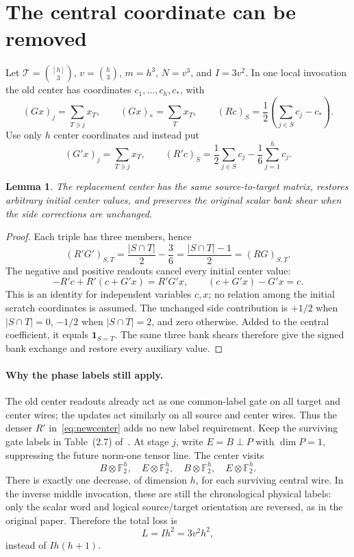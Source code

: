 \documentclass[11pt]{article}
\newtheorem{lemma}{Lemma}
\newcommand{\F}{\mathbb F}
\begin{document}
\section{The central coordinate can be removed}
Let $\mathcal T=\binom{[h]}3$, $v=\binom h3$, $m=h^3$, $N=v^3$, and $I=3v^2$. In one local invocation the old center has coordinates $c_1,\ldots,c_h,c_*$, with
\[
 (Gx)_j=\sum_{T\ni j}x_T,\qquad (Gx)_*=\sum_Tx_T,
 \qquad (Rc)_S=\frac12\left(\sum_{j\in S}c_j-c_*\right).
\]
Use only $h$ center coordinates and instead put
\begin{equation}\label{eq:newcenter}
 (G'x)_j=\sum_{T\ni j}x_T,\qquad
 (R'c)_S=\frac12\sum_{j\in S}c_j-\frac16\sum_{j=1}^h c_j.
\end{equation}
\begin{lemma}
The replacement center has the same source-to-target matrix, restores arbitrary initial center values, and preserves the original scalar bank shear when the side corrections are unchanged.
\end{lemma}
\begin{proof}
Each triple has three members, hence
\[
 (R'G')_{S,T}=\frac{|S\cap T|}{2}-\frac36
              =\frac{|S\cap T|-1}{2}=(RG)_{S,T}.
\]
The negative and positive readouts cancel every initial center value:
\[
 -R'c+R'(c+G'x)=R'G'x,\qquad (c+G'x)-G'x=c.
\]
This is an identity for independent variables $c,x$; no relation among the initial scratch coordinates is assumed. The unchanged side contribution is $+1/2$ when $|S\cap T|=0$, $-1/2$ when $|S\cap T|=2$, and zero otherwise. Added to the central coefficient, it equals $\mathbf 1_{S=T}$. The same three bank shears therefore give the signed bank exchange and restore every auxiliary value.
\end{proof}

\paragraph{Why the phase labels still apply.}
The old center readouts already act as one common-label gate on all target and center wires; the updates act similarly on all source and center wires. Thus the denser $R'$ in~\eqref{eq:newcenter} adds no new label requirement. Keep the surviving gate labels in Table~(2.7) of~\cite{O}. At stage $j$, write $E=B\perp P$ with $\dim P=1$, suppressing the future norm-one tensor line. The center visits
\[
 B\otimes\F_2^h,\quad E\otimes\F_2^h,\quad
 B\otimes\F_2^h,\quad E\otimes\F_2^h.
\]
There is exactly one decrease, of dimension $h$, for each surviving central wire. In the inverse middle invocation, these are still the chronological physical labels: only the scalar word and logical source/target orientation are reversed, as in the original paper. Therefore the total loss is
\begin{equation}\label{eq:loss}
 L=Ih^2=3v^2h^2,
\end{equation}
instead of $Ih(h+1)$.
\end{document}
